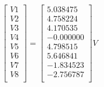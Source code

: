 \begin{equation} 
\begin{bmatrix}
V1 \\V2 \\V3 \\V4 \\V5 \\V6 \\V7 \\V8 \\\end{bmatrix} = 
\begin{bmatrix}
5.038475 \\4.758224 \\4.170535 \\-0.000000 \\4.798515 \\5.646841 \\-1.834523 \\-2.756787 \\\end{bmatrix} V
\label{eqsol}
 \end{equation}